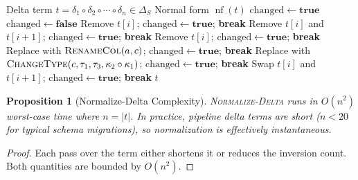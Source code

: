 \documentclass[11pt,a4paper]{article}
\newtheorem{proposition}[theorem]{Proposition}
\theoremstyle{definition}
\newcommand{\DeltaS}{\Delta_{\!S}}
\newcommand{\epsS}{\varepsilon_S}
\DeclareMathOperator{\nf}{nf}
\begin{document}
\begin{algorithm}[htbp]
\caption{\textsc{Normalize-Delta}: Delta Term Normalization via DTRS}
\label{alg:normalize-delta}
\begin{algorithmic}[1]
\Require Delta term $t = \delta_1 \circ \delta_2 \circ \cdots \circ \delta_n \in \DeltaS$
\Ensure Normal form $\nf(t)$
\State $\mathrm{changed} \gets \mathbf{true}$
  \State $\mathrm{changed} \gets \mathbf{false}$
    \If{$t[i] = \epsS$}
      \State Remove $t[i]$; $\mathrm{changed} \gets \mathbf{true}$; \textbf{break}
    \EndIf
      \State Remove $t[i]$ and $t[i\!+\!1]$; $\mathrm{changed} \gets \mathbf{true}$; \textbf{break}
    \EndIf
      \State Remove $t[i]$; $\mathrm{changed} \gets \mathbf{true}$; \textbf{break}
    \EndIf
      \State Replace with $\textsc{RenameCol}(a,c)$; $\mathrm{changed} \gets \mathbf{true}$; \textbf{break}
    \EndIf
      \State Replace with $\textsc{ChangeType}(c,\tau_1,\tau_3,\kappa_2 \circ \kappa_1)$;
        $\mathrm{changed} \gets \mathbf{true}$; \textbf{break}
    \EndIf
      \State Swap $t[i]$ and $t[i\!+\!1]$; $\mathrm{changed} \gets \mathbf{true}$; \textbf{break}
    \EndIf
  \EndFor
\EndWhile
\State \Return $t$
\end{algorithmic}
\end{algorithm}

\begin{proposition}[Normalize-Delta Complexity]\label{prop:normalize-complexity}
\textsc{Normalize-Delta} runs in $O(n^2)$ worst-case time where $n = |t|$.
In practice, pipeline delta terms are short ($n < 20$ for typical schema
migrations), so normalization is effectively instantaneous.
\end{proposition}

\begin{proof}
Each pass over the term either shortens it or reduces the inversion count.
Both quantities are bounded by $O(n^2)$.
\end{proof}
\end{document}
